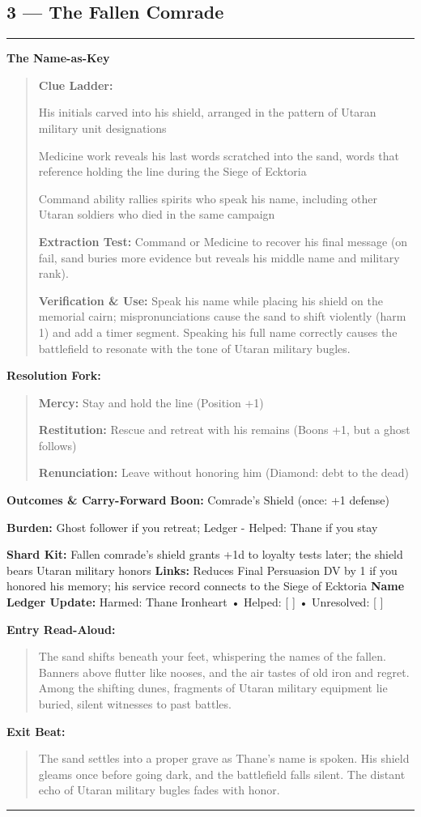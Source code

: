 \documentclass[18pt, letterpaper, twoside]{article}
\newenvironment{floorbox}[1]{%
    \begin{center}
    \begin{minipage}{0.95\textwidth}
    \subsection*{#1}
    \vspace{-0.5em}
    \rule{\textwidth}{0.5pt}
    \vspace{0.5em}
}{%
    \vspace{0.5em}
    \rule{\textwidth}{0.5pt}
    \end{minipage}
    \end{center}
}
\newenvironment{gmnote}[1]{%
    \vspace{0.5em}
    \noindent\textbf{#1}
    \begin{quote}
}{%
    \end{quote}
    \vspace{0.5em}
}
\newenvironment{resolutionbox}{%
    \vspace{0.5em}
    \noindent\textbf{Resolution Fork:}
    \begin{quote}
}{%
    \end{quote}
    \vspace{0.5em}
}
\newenvironment{boxedtext}[1]{%
    \vspace{0.5em}
    \noindent\textbf{#1}
    \begin{quote}
}{%
    \end{quote}
    \vspace{0.5em}
}
\newcommand{\boon}[1]{\noindent\textbf{Boon:} #1\par}
\newcommand{\burden}[1]{\noindent\textbf{Burden:} #1\par}
\newcommand{\entrytext}[1]{\begin{boxedtext}{Entry Read-Aloud:} #1 \end{boxedtext}}
\newcommand{\exittext}[1]{\begin{boxedtext}{Exit Beat:} #1 \end{boxedtext}}
\begin{document}
\begin{floorbox}{3 --- The Fallen Comrade}
\begin{gmnote}{The Name-as-Key}
\textbf{Clue Ladder:}
\begin{description}[leftmargin=*, style=unboxed]
    \item[Gentle Nudge:] His initials carved into his shield, arranged in the pattern of Utaran military unit designations
    \item[Actionable Lead:] Medicine work reveals his last words scratched into the sand, words that reference holding the line during the Siege of Ecktoria
    \item[Aha! Proof:] Command ability rallies spirits who speak his name, including other Utaran soldiers who died in the same campaign
\end{description}

\textbf{Extraction Test:} Command or Medicine to recover his final message (on fail, sand buries more evidence but reveals his middle name and military rank).

\textbf{Verification \& Use:} Speak his name while placing his shield on the memorial cairn; mispronunciations cause the sand to shift violently (harm 1) and add a timer segment. Speaking his full name correctly causes the battlefield to resonate with the tone of Utaran military bugles.
\end{gmnote}

\begin{resolutionbox}
\textbf{Mercy:} Stay and hold the line (Position +1)

\textbf{Restitution:} Rescue and retreat with his remains (Boons +1, but a ghost follows)

\textbf{Renunciation:} Leave without honoring him (Diamond: debt to the dead)
\end{resolutionbox}

\textbf{Outcomes \& Carry-Forward}
\boon{Comrade's Shield (once: +1 defense)}
\burden{Ghost follower if you retreat; Ledger - Helped: Thane if you stay}
\textbf{Shard Kit:} Fallen comrade's shield grants +1d to loyalty tests later; the shield bears Utaran military honors
\textbf{Links:} Reduces Final Persuasion DV by 1 if you honored his memory; his service record connects to the Siege of Ecktoria
\textbf{Name Ledger Update:} Harmed: Thane Ironheart • Helped: [ ] • Unresolved: [ ]

\entrytext{The sand shifts beneath your feet, whispering the names of the fallen. Banners above flutter like nooses, and the air tastes of old iron and regret. Among the shifting dunes, fragments of Utaran military equipment lie buried, silent witnesses to past battles.}

\exittext{The sand settles into a proper grave as Thane's name is spoken. His shield gleams once before going dark, and the battlefield falls silent. The distant echo of Utaran military bugles fades with honor.}
\end{floorbox}
\end{document}
